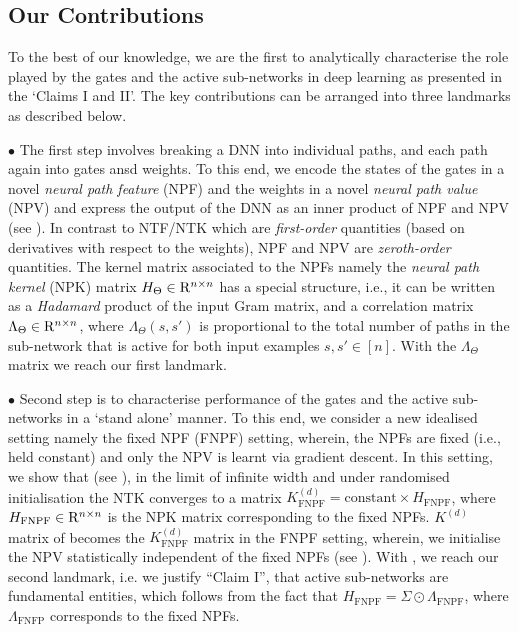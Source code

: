 \documentclass{article}
\begin{document}
\subsection{Our Contributions}\label{sec:contrib}
To the best of our knowledge, we are the first to analytically characterise the role played by the gates and the active sub-networks in deep learning as presented in the `Claims I and II'.  The key contributions can be arranged into three landmarks as described below.

$\bullet$ The first step involves breaking a DNN into individual paths, and each path again into gates ansd weights.  To this end, we encode the states of the gates in a novel \emph{neural path feature} (NPF) and the weights in a novel \emph{neural path value} (NPV) and express the output of the DNN as an inner product of NPF and NPV (see ). In contrast to NTF/NTK which are \emph{first-order} quantities (based on derivatives with respect to the weights), NPF and NPV are \emph{zeroth-order} quantities. The kernel matrix associated to the NPFs namely the \emph{neural path kernel} (NPK) matrix $H_{\Theta}\in\mathrm{R}^{n\times n}$ has a special structure, i.e., it can be written as a \emph{Hadamard} product of the input Gram matrix, and a correlation matrix $\Lambda_{\Theta}\in\mathrm{R}^{n\times n}$, where $\Lambda_{\Theta}(s,s')$ is proportional to the total number of paths in the sub-network that is active for both input examples $s,s'\in[n]$. With the $\Lambda_{\Theta}$ matrix we reach our first landmark.

$\bullet$  Second step is to characterise performance of the gates and the active sub-networks in a `stand alone' manner. To this end, we consider a new idealised setting namely the fixed NPF (FNPF) setting, wherein, the NPFs are fixed (i.e., held constant) and only the NPV is learnt via gradient descent. In this setting, we show that (see ), in the limit of infinite width and under randomised initialisation the NTK converges to a matrix $K^{(d)}_{\text{FNPF}}=\text{constant} \times H_{\text{FNPF}}$, where $H_{\text{FNPF}}\in\mathrm{R}^{n\times n}$ is the NPK matrix corresponding to the fixed NPFs. $K^{(d)}$ matrix of \cite{ntk,arora2019exact,cao2019generalization} becomes the $K^{(d)}_{\text{FNPF}}$ matrix in the FNPF setting,  wherein, we initialise the NPV statistically independent of the fixed NPFs (see ). With , we reach our second landmark, i.e. we justify ``Claim I'', that active sub-networks are fundamental entities, which follows from the fact that $H_{\text{FNPF}}=\Sigma\odot \Lambda_{\text{FNPF}}$, where $\Lambda_{\text{FNFP}}$ corresponds to the fixed NPFs.
\end{document}
